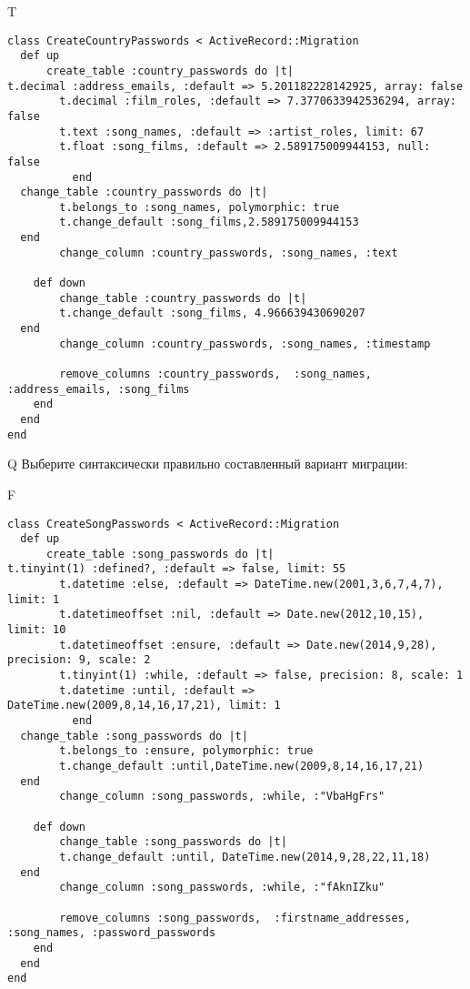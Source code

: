 T
\begin{verbatim}
class CreateCountryPasswords < ActiveRecord::Migration
  def up
	  create_table :country_passwords do |t|
t.decimal :address_emails, :default => 5.201182228142925, array: false
		t.decimal :film_roles, :default => 7.3770633942536294, array: false
		t.text :song_names, :default => :artist_roles, limit: 67
		t.float :song_films, :default => 2.589175009944153, null: false
		  end
  change_table :country_passwords do |t|
		t.belongs_to :song_names, polymorphic: true
 		t.change_default :song_films,2.589175009944153
  end
 		change_column :country_passwords, :song_names, :text
   
	def down
		change_table :country_passwords do |t|
		t.change_default :song_films, 4.966639430690207
  end
 		change_column :country_passwords, :song_names, :timestamp
   
		remove_columns :country_passwords,  :song_names, :address_emails, :song_films 
    end 
  end
end

\end{verbatim}

Q
Выберите синтаксически правильно составленный вариант миграции:

F
\begin{verbatim}
class CreateSongPasswords < ActiveRecord::Migration
  def up
	  create_table :song_passwords do |t|
t.tinyint(1) :defined?, :default => false, limit: 55
		t.datetime :else, :default => DateTime.new(2001,3,6,7,4,7), limit: 1
		t.datetimeoffset :nil, :default => Date.new(2012,10,15), limit: 10
		t.datetimeoffset :ensure, :default => Date.new(2014,9,28), precision: 9, scale: 2
		t.tinyint(1) :while, :default => false, precision: 8, scale: 1
		t.datetime :until, :default => DateTime.new(2009,8,14,16,17,21), limit: 1
		  end
  change_table :song_passwords do |t|
		t.belongs_to :ensure, polymorphic: true
 		t.change_default :until,DateTime.new(2009,8,14,16,17,21)
  end
 		change_column :song_passwords, :while, :"VbaHgFrs"
   
	def down
		change_table :song_passwords do |t|
		t.change_default :until, DateTime.new(2014,9,28,22,11,18)
  end
 		change_column :song_passwords, :while, :"fAknIZku"
   
		remove_columns :song_passwords,  :firstname_addresses, :song_names, :password_passwords 
    end 
  end
end

\end{verbatim}

